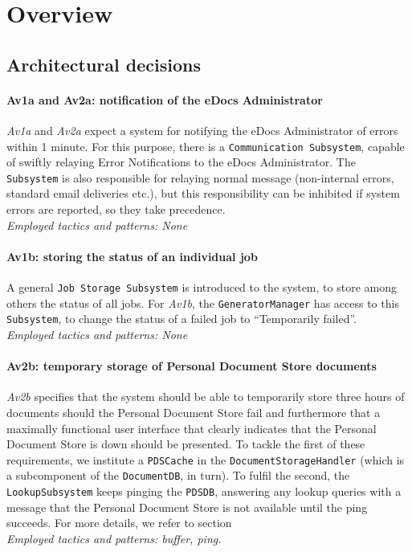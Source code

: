 \section{Overview}\label{sec:overview}
\subsection{Architectural decisions}

\paragraph{Av1a and Av2a\@: notification of the eDocs Administrator}
\emph{Av1a} and \emph{Av2a} expect a system for notifying the eDocs Administrator of errors within 1 minute. For this purpose, there is a \texttt{Communication Subsystem}, capable of swiftly relaying Error Notifications to the eDocs Administrator. The \texttt{Subsystem} is also responsible for relaying normal message (non-internal errors, standard email deliveries etc.), but this responsibility can be inhibited if system errors are reported, so they take precedence.\\
\emph{Employed tactics and patterns: None}
    
\paragraph{Av1b\@: storing the status of an individual job}
A general \texttt{Job Storage Subsystem} is introduced to the system, to store among others the status of all jobs. For \emph{Av1b}, the \texttt{GeneratorManager} has access to this \texttt{Subsystem}, to change the status of a failed job to ``Temporarily failed''.\\
\emph{Employed tactics and patterns: None}
    
\paragraph{Av2b\@: temporary storage of Personal Document Store documents} \emph{Av2b} specifies that the system should be able to temporarily store three hours of documents should the Personal Document Store fail and furthermore that a maximally functional user interface that clearly indicates that the Personal Document Store is down should be presented. To tackle the first of these requirements, we institute a \texttt{PDSCache} in the \texttt{DocumentStorageHandler} (which is a subcomponent of the \texttt{DocumentDB}, in turn). To fulfil the second, the \texttt{LookupSubsystem} keeps pinging the \texttt{PDSDB}, answering any lookup queries with a message that the Personal Document Store is not available until the ping succeeds. For more details, we refer to section \\
\emph{Employed tactics and patterns: buffer, ping.}
    
